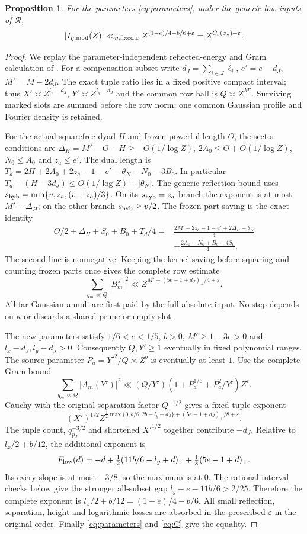\documentclass[11pt,a4paper]{article}
\newtheorem{proposition}[theorem]{Proposition}
\theoremstyle{definition}
\newcommand{\eps}{\varepsilon}
\newcommand{\sig}{\sigma_*}
\begin{document}
\begin{proposition}\label{prop:low}
For the parameters \eqref{eq:parameters}, under the generic low
inputs of $\mathcal R$,
\[
 |I_{\eta,\rm mod}(Z)|
 \ll_{\eta,\rm fixed,\eps}Z^{(1-e)/4-b/6+\eps}
 =Z^{C_b(\sig)+\eps}.
\]
\end{proposition}
\begin{proof}
We replay the parameter-independent reflected-energy and Gram
calculation of \cite{FreeB}. For a compensation subset write
$d_J=\sum_{i\in J}\ell_i$, $e'=e-d_J$, $M'=M-2d_J$.
The exact tuple ratio lies in a fixed positive compact interval;
thus $X'\asymp Z^{l_x-d_J}$, $Y'\asymp Z^{l_y-d_J}$
and the common row ball is $Q\asymp Z^{M'}$.
Surviving marked slots are summed before the row norm;
one common Gaussian profile and Fourier density is retained.

For the actual squarefree dyad $H$ and frozen powerful length $O$,
the sector conditions are
$\Delta_H=M'-O-H\ge-O(1/\log Z)$,
$2A_0\le O+O(1/\log Z)$, $N_0\le A_0$ and $z_a\le e'$.
The dual length is
$T_d=2H+2A_0+2z_a-1-e'-\theta_N-N_0-3B_0$.
In particular $T_d-(H-3d_J)\le O(1/\log Z)+|\theta_N|$.
The generic reflection bound uses
$s_{\rm hyb}=\min\{v,z_a,(v+z_a)/3\}$.
On its $s_{\rm hyb}=z_a$ branch the exponent is at most
$M'-\Delta_H$; on the other branch $s_{\rm hyb}\ge v/2$.
The frozen-part saving is the exact identity
\[
\begin{split}
 O/2+\Delta_H+S_0+B_0+T_d/4
 ={}&\frac{2M'+2z_a-1-e'+2\Delta_H-\theta_N}{4}\\
 &+\frac{2A_0-N_0+B_0+4S_0}{4}.
\end{split}
\]
The second line is nonnegative. Keeping the kernel saving before
squaring and counting frozen parts once gives the complete row estimate
\[
 \sum_{q_m\ll Q}|B_m^J|^2
 \ll Z^{M'+(5e-1+d_J)_+/4+\eps}.
\]
All far Gaussian annuli are first paid by the full absolute input.
No step depends on $\kappa$ or discards a shared prime or empty slot.

The new parameters satisfy $1/6<e<1/5$, $b>0$,
$M'\ge1-3e>0$ and $l_x-d_J,l_y-d_J>0$.
Consequently $Q,Y'\ge1$ eventually in fixed polynomial ranges.
The source parameter $P_a=Y'^2/Q\asymp Z^b$ is eventually at least
$1$. Use the complete Gram bound
\[
 \sum_{q_m\ll Q}|A_m(Y')|^2
 \ll (Q/Y')(1+P_a^{1/6}+P_a^2/Y')Z^\eps .
\]
Cauchy with the original separation factor $Q^{-1/2}$ gives a
fixed tuple exponent
\[
 (X')^{1/2}
 Z^{\frac12\max\{0,b/6,2b-l_y+d_J\}
       +(5e-1+d_J)_+/8+\eps}.
\]
The tuple count, $q_{p_J}^{-3/2}$ and shortened $X'^{1/2}$
together contribute $-d_J$.
Relative to $l_x/2+b/12$, the additional exponent is
\[
 F_{\rm low}(d)=-d+\tfrac12(11b/6-l_y+d)_+
                         +\tfrac18(5e-1+d)_+ .
\]
Its every slope is at most $-3/8$, so the maximum is at $0$.
The rational interval checks below give the stronger all-subset
gap $l_y-e-11b/6>2/25$. Therefore the complete exponent is
$l_x/2+b/12=(1-e)/4-b/6$.
All small reflection, separation, height and logarithmic losses
are absorbed in the prescribed $\eps$ in the original order.
Finally \eqref{eq:parameters} and \eqref{eq:C} give the equality.
\end{proof}
\end{document}
